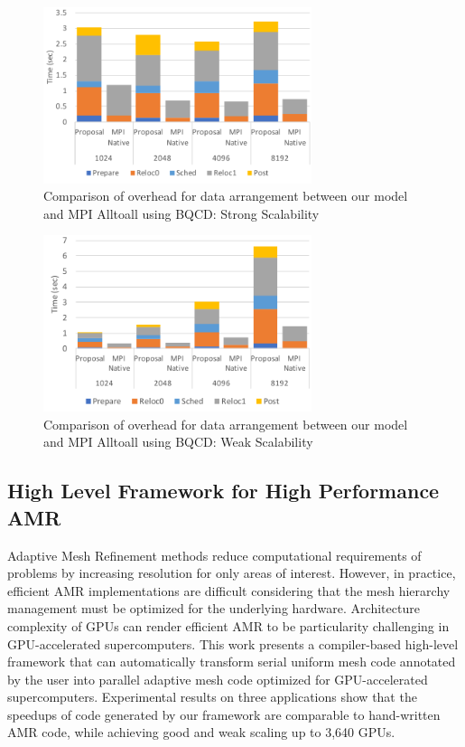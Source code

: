 \documentclass{book}
\begin{document}
\begin{figure}
  \centering
  \includegraphics[width=0.7\textwidth]{figs/eval_bqcd_ss.pdf}
  \caption{Comparison of overhead for data arrangement between our
    model and MPI Alltoall using BQCD: Strong Scalability}
  \label{takizawa_eval_bqcd_ss}
\end{figure}

\begin{figure}
  \centering
  \includegraphics[width=0.7\textwidth]{figs/eval_bqcd_ws.pdf}
  \caption{Comparison of overhead for data arrangement between our
    model and MPI Alltoall using BQCD: Weak Scalability}
  \label{takizawa_eval_bqcd_ws}
\end{figure}

\subsection{High Level Framework for High Performance AMR}
Adaptive Mesh Refinement methods reduce computational requirements of problems by increasing resolution for only areas of interest. However, in practice, efficient AMR implementations are difficult considering that the mesh hierarchy management must be optimized for the underlying hardware. Architecture complexity of GPUs can render efficient AMR to be particularity challenging in GPU-accelerated supercomputers. This work presents a compiler-based high-level framework that can automatically transform serial uniform mesh code annotated by the user into parallel adaptive mesh code optimized for GPU-accelerated supercomputers. Experimental results on three applications show that the speedups of code generated by our framework are comparable to hand-written AMR code, while achieving good and weak scaling up to 3,640 GPUs.
\end{document}
